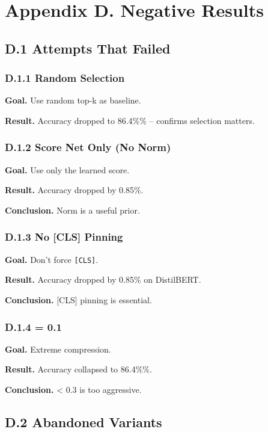 \section{Appendix D. Negative Results}

\subsection{D.1 Attempts That Failed}

\subsubsection{D.1.1 Random Selection}

\textbf{Goal.} Use random top-k as baseline.

\textbf{Result.} Accuracy dropped to 86.4\%\% -- confirms selection matters.

\subsubsection{D.1.2 Score Net Only (No Norm)}

\textbf{Goal.} Use only the learned score.

\textbf{Result.} Accuracy dropped by 0.85\%.

\textbf{Conclusion.} Norm is a useful prior.

\subsubsection{D.1.3 No [CLS] Pinning}

\textbf{Goal.} Don't force \texttt{[CLS]}.

\textbf{Result.} Accuracy dropped by 0.85\% on DistilBERT.

\textbf{Conclusion.} [CLS] pinning is essential.

\subsubsection{D.1.4   = 0.1}

\textbf{Goal.} Extreme compression.

\textbf{Result.} Accuracy collapsed to 86.4\%\%.

\textbf{Conclusion.}   \textless{} 0.3 is too aggressive.

\subsection{D.2 Abandoned Variants}

